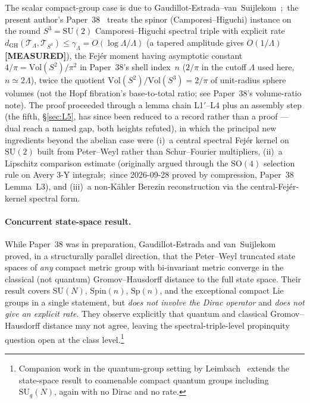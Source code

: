 \documentclass[11pt,a4paper]{article}
\theoremstyle{plain}
\theoremstyle{definition}
\newcommand{\Lammax}{\Lambda}
\newcommand{\Tcal}{\mathcal{T}}
\newcommand{\SU}{\mathrm{SU}}
\newcommand{\SO}{\mathrm{SO}}
\newcommand{\Spin}{\mathrm{Spin}}
\newcommand{\Sp}{\mathrm{Sp}}
\newcommand{\Vol}{\mathrm{Vol}}
\begin{document}
The scalar compact-group case is due to
Gaudillot-Estrada--van~Suijlekom~\cite{gaudillot_estrada_vs2025};\ the present
author's Paper~38~\cite{paper38} treats the spinor (Camporesi--Higuchi) instance on the round
$S^3 = \SU(2)$ Camporesi--Higuchi spectral triple with explicit rate
\(
d_{\mathrm{GH}}(\Tcal_\Lammax, \Tcal_{S^3}) \le \gamma_\Lammax = O(\log \Lammax / \Lammax)
\)
(a tapered amplitude gives $O(1/\Lammax)$ \textbf{[MEASURED]}),
the Fej\'er moment having asymptotic constant $4/\pi = \Vol(S^2)/\pi^2$ in Paper~38's shell index~$n$
($2/\pi$ in the cutoff $\Lammax$ used here, $n \simeq 2\Lammax$), twice the quotient
$\Vol(S^2)/\Vol(S^3) = 2/\pi$ of unit-radius sphere volumes (not the Hopf fibration's base-to-total ratio;
see Paper~38's volume-ratio note). The proof proceeded
through a lemma chain L1$'$--L4 plus an assembly step (the fifth,
\S\ref{sec:L5}, has since been reduced to a record rather than a proof
--- dual reach a named gap, both heights refuted), in which the
principal new ingredients beyond the abelian case were (i)~a central spectral Fej\'er
kernel on $\SU(2)$ built from Peter--Weyl rather than Schur--Fourier
multipliers, (ii)~a Lipschitz comparison estimate (originally argued
through the $\SO(4)$ selection rule on Avery 3-Y integrals;\ since
2026-09-28 proved by compression, Paper~38 Lemma~L3), and (iii)~a non-K\"ahler
Berezin reconstruction via the central-Fej\'er-kernel spectral form.

\paragraph{Concurrent state-space result.}
While Paper~38 was in preparation, Gaudillot-Estrada and
van~Suijlekom~\cite{gaudillot_estrada_vs2025} proved, in a structurally
parallel direction, that the Peter--Weyl truncated state spaces of
\emph{any} compact metric group with bi-invariant metric converge in the
classical (not quantum) Gromov--Hausdorff distance to the full state
space. Their result covers $\SU(N)$, $\Spin(n)$, $\Sp(n)$, and the
exceptional compact Lie groups in a single statement, but
\emph{does not involve the Dirac operator} and \emph{does not give an
explicit rate}. They observe explicitly that quantum and classical
Gromov--Hausdorff distance may not agree, leaving the
spectral-triple-level propinquity question open at the class
level.\footnote{Companion work in the quantum-group setting by
Leimbach~\cite{leimbach2024} extends the state-space result to coamenable
compact quantum groups including $\SU_q(N)$, again with no Dirac and
no rate.}
\end{document}
